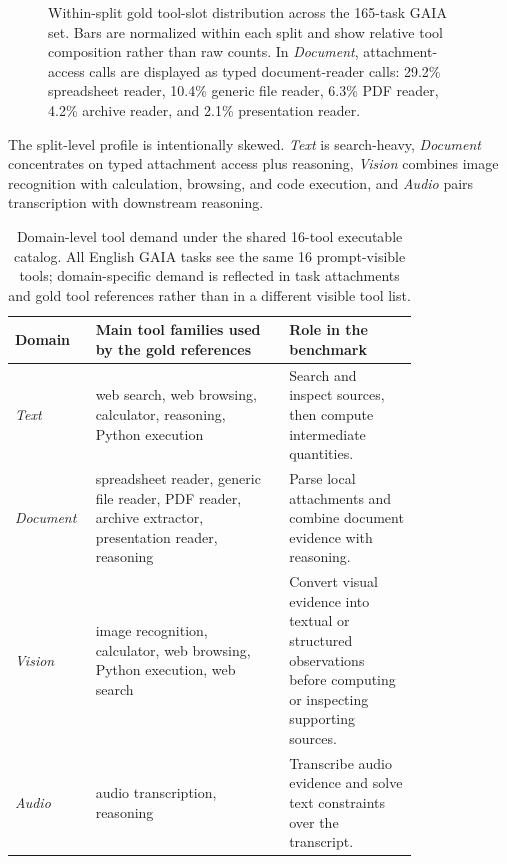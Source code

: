 \documentclass{article}
\begin{document}
\begin{figure}[H]
{}
\caption{Within-split gold tool-slot distribution across the 165-task GAIA set. Bars are normalized within each split and show relative tool composition rather than raw counts. In \emph{Document}, attachment-access calls are displayed as typed document-reader calls: 29.2\% spreadsheet reader, 10.4\% generic file reader, 6.3\% PDF reader, 4.2\% archive reader, and 2.1\% presentation reader.}
\label{fig:appendix-gaia-tool-distribution}
\end{figure}

The split-level profile is intentionally skewed. \emph{Text} is search-heavy, \emph{Document} concentrates on typed attachment access plus reasoning, \emph{Vision} combines image recognition with calculation, browsing, and code execution, and \emph{Audio} pairs transcription with downstream reasoning.

\begin{table}[H]
\centering
\scriptsize
\setlength{\tabcolsep}{5pt}
\begin{tabular}{lp{0.48\linewidth}p{0.32\linewidth}}
\toprule
Domain & Main tool families used by the gold references & Role in the benchmark \\
\midrule
\emph{Text} & web search, web browsing, calculator, reasoning, Python execution & Search and inspect sources, then compute intermediate quantities. \\
\emph{Document} & spreadsheet reader, generic file reader, PDF reader, archive extractor, presentation reader, reasoning & Parse local attachments and combine document evidence with reasoning. \\
\emph{Vision} & image recognition, calculator, web browsing, Python execution, web search & Convert visual evidence into textual or structured observations before computing or inspecting supporting sources. \\
\emph{Audio} & audio transcription, reasoning & Transcribe audio evidence and solve text constraints over the transcript. \\
\bottomrule
\end{tabular}
\vspace{0.05cm}
\caption{Domain-level tool demand under the shared 16-tool executable catalog. All English GAIA tasks see the same 16 prompt-visible tools; domain-specific demand is reflected in task attachments and gold tool references rather than in a different visible tool list.}
\label{tab:appendix-domain-tool-interface}
\end{table}
\end{document}
